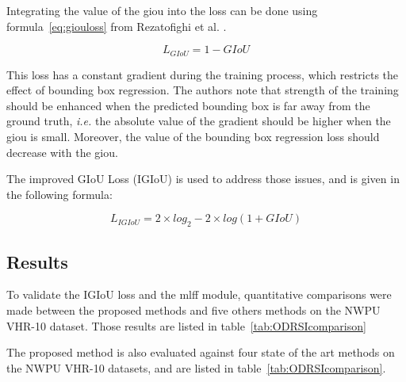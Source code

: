 Integrating the value of the \gls{giou} into the loss can be done using formula~\ref{eq:giouloss} from Rezatofighi et al. \cite{giou}.

\begin{equation}
	\label{eq:giouloss}
		L_{GIoU} = 1 - GIoU
\end{equation}

This loss has a constant gradient during the training process, which restricts the effect of bounding box regression. The authors note that strength of the training should be enhanced when the predicted bounding box is far away from the ground truth, \textit{i.e.} the absolute value of the gradient should be higher when the \gls{giou} is small. Moreover, the value of the bounding box regression loss should decrease with the \gls{giou}. 

The improved GIoU Loss (IGIoU) is used to address those issues, and is given in the following formula:

\begin{equation}
	L_{IGIoU} = 2 \times log_2 - 2 \times log(1 + GIoU)
\end{equation}

\subsection{Results}
To validate the IGIoU loss and the \gls{mlff} module, quantitative comparisons were made between the proposed methods and five others methods on the NWPU VHR-10 dataset\cite{nwpu}. Those results are listed in table~\ref{tab:ODRSIcomparison}

The proposed method is also evaluated against four state of the art methods on the NWPU VHR-10 datasets, and are listed in table~\ref{tab:ODRSIcomparison}. 

